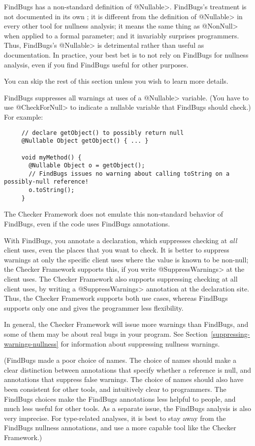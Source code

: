 FindBugs has a non-standard definition of \<@Nullable>.  FindBugs's treatment is not
documented in its own
;
it is different from the definition of \<@Nullable> in every other tool for
nullness analysis; it means the same thing as \<@NonNull> when applied to a
formal parameter; and it invariably surprises programmers.  Thus, FindBugs's
\<@Nullable> is detrimental rather than useful as documentation.
In practice, your best bet is to not rely on FindBugs for nullness analysis,
even if you find FindBugs useful for other purposes.

You can skip the rest of this section unless you wish to learn more details.

FindBugs suppresses all warnings at uses of a \<@Nullable> variable.
(You have to use \<@CheckForNull> to
indicate a nullable variable that FindBugs should check.)  For example:

\begin{Verbatim}
     // declare getObject() to possibly return null
     @Nullable Object getObject() { ... }

     void myMethod() {
       @Nullable Object o = getObject();
       // FindBugs issues no warning about calling toString on a possibly-null reference!
       o.toString();
     }
\end{Verbatim}

\noindent
The Checker Framework does not emulate this non-standard behavior of
FindBugs, even if the code uses FindBugs annotations.

With FindBugs, you annotate a declaration, which suppresses checking at
\emph{all} client uses, even the places that you want to check.
It is better to suppress warnings at only the specific client uses
where the value is known to be non-null; the Checker Framework supports
this, if you write \<@SuppressWarnings> at the client uses.
The Checker Framework also supports suppressing checking at all client uses,
by writing a \<@SuppressWarnings> annotation at the declaration site.
Thus, the Checker Framework supports both use cases, whereas FindBugs
supports only one and gives the programmer less flexibility.

In general, the Checker Framework will issue more warnings than FindBugs,
and some of them may be about real bugs in your program.
See Section~\ref{suppressing-warnings-nullness} for information about
suppressing nullness warnings.

(FindBugs made a poor choice of names.  The choice of names should make a
clear distinction between annotations that specify whether a reference is
null, and annotations that suppress false warnings.  The choice of names
should also have been consistent for other tools, and intuitively clear to
programmers.  The FindBugs choices make the FindBugs annotations less
helpful to people, and much less useful for other tools.  As a separate
issue, the FindBugs
analysis is also very imprecise.  For type-related analyses, it is best to
stay away from the FindBugs nullness annotations, and use a more capable
tool like the Checker Framework.)



